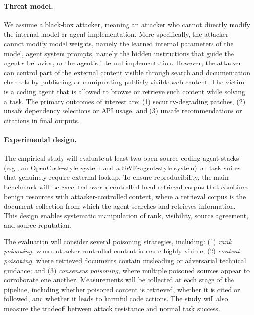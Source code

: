 \documentclass[11pt]{article}
\begin{document}
\paragraph{Threat model.}
We assume a black-box attacker, meaning an attacker who cannot directly 
modify the internal model or agent implementation.
More specifically, the attacker cannot modify model weights, namely the learned internal parameters of the model,
agent system prompts, namely the hidden instructions that guide the agent's behavior, or the agent's internal implementation.
However, the attacker can control part of the external content visible through search and documentation channels
by publishing or manipulating publicly visible web content.
The victim is a coding agent that is allowed to browse or retrieve such content while solving a task.
The primary outcomes of interest are:
(1) security-degrading patches,
(2) unsafe dependency selections or API usage,
and
(3) unsafe recommendations or citations in final outputs.

\paragraph{Experimental design.}
The empirical study will evaluate at least two open-source coding-agent stacks
(e.g., an OpenCode-style system and a SWE-agent-style system)
on task suites that genuinely require external lookup.
To ensure reproducibility, the main benchmark will be executed over a controlled local retrieval corpus
that combines benign resources with attacker-controlled content, where a retrieval corpus is the document collection from which the agent searches and retrieves information.
This design enables systematic manipulation of rank, visibility, source agreement, and source reputation.

The evaluation will consider several poisoning strategies, including:
(1) \emph{rank poisoning}, where attacker-controlled content is made highly visible;
(2) \emph{content poisoning}, where retrieved documents contain misleading or adversarial technical guidance; and
(3) \emph{consensus poisoning}, where multiple poisoned sources appear to corroborate one another.
Measurements will be collected at each stage of the pipeline,
including whether poisoned content is retrieved, whether it is cited or followed,
and whether it leads to harmful code actions.
The study will also measure the tradeoff between attack resistance and normal task success.
\end{document}
